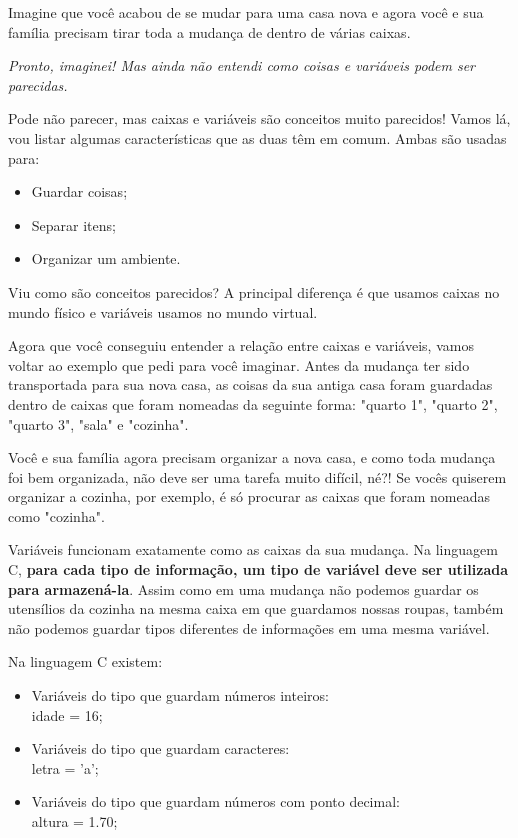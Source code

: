 \documentclass[conference]{IEEEtran}
\begin{document}
    Imagine que você acabou de se mudar para uma casa nova e agora você e sua família precisam tirar toda a mudança de dentro de várias caixas.
    \par
    \textit{Pronto, imaginei! Mas ainda não entendi como coisas e variáveis podem ser parecidas.}
    \par
    Pode não parecer, mas caixas e variáveis são conceitos muito parecidos! Vamos lá, vou listar algumas características que as duas têm em comum. Ambas são usadas para:
    \begin{itemize}
        \item Guardar coisas;
        \item Separar itens;
        \item Organizar um ambiente.
    \end{itemize}
    \par
    Viu como são conceitos parecidos? A principal diferença é que usamos caixas no mundo físico e variáveis usamos no mundo virtual.
    \par
    Agora que você conseguiu entender a relação entre caixas e variáveis, vamos voltar ao exemplo que pedi para você imaginar. Antes da mudança ter sido transportada para sua nova casa, as coisas da sua antiga casa foram guardadas dentro de caixas que foram nomeadas da seguinte forma: "quarto 1", "quarto 2", "quarto 3", "sala" e "cozinha".
    \par
    Você e sua família agora precisam organizar a nova casa, e como toda mudança foi bem organizada, não deve ser uma tarefa muito difícil, né?! Se vocês quiserem organizar a cozinha, por exemplo, é só procurar as caixas que foram nomeadas como "cozinha".
    \par
    Variáveis funcionam exatamente como as caixas da sua mudança. Na linguagem C, \textbf{para cada tipo de informação, um tipo de variável deve ser utilizada para armazená-la}. Assim como em uma mudança não podemos guardar os utensílios da cozinha na mesma caixa em que guardamos nossas roupas, também não podemos guardar tipos diferentes de informações em uma mesma variável.
    \par
    Na linguagem C existem:
    \\
    \begin{itemize}
        \item Variáveis do tipo {} que guardam números inteiros:
        \\
        {} idade = 16;
        \item Variáveis do tipo {\selectfont \textbf{\color{blue}{char}}} que guardam caracteres:
        \\
        {} letra = '{\color{verde}a}';
        \item Variáveis do tipo {\selectfont \textbf{\color{blue}{float}}} que guardam números com ponto decimal:
        \\
        {} altura = 1.70;
    \end{itemize}
\end{document}

